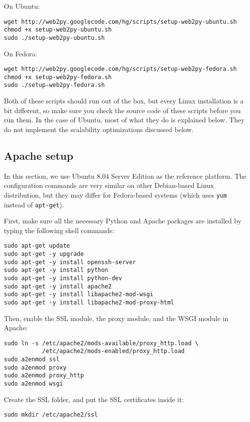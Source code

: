 \documentclass[justified,sixbynine,notoc]{tufte-book}
\def\ft{\small\tt}
\begin{document}
\begin{fullwidth}
On Ubuntu:
\begin{lstlisting}
wget http://web2py.googlecode.com/hg/scripts/setup-web2py-ubuntu.sh
chmod +x setup-web2py-ubuntu.sh
sudo ./setup-web2py-ubuntu.sh
\end{lstlisting}
On Fedora:
\begin{lstlisting}
wget http://web2py.googlecode.com/hg/scripts/setup-web2py-fedora.sh
chmod +x setup-web2py-fedora.sh
sudo ./setup-web2py-fedora.sh
\end{lstlisting}
Both of these scripts should run out of the box, but every Linux installation is a bit different, so make sure you check the source code of these scripts before you run them. In the case of Ubuntu, most of what they do is explained below. They do not implement the scalability optimizations discussed below.

\goodbreak\subsection{Apache setup}

In this section, we use Ubuntu 8.04 Server Edition as the reference platform. The configuration commands are very similar on other Debian-based Linux distribution, but they may differ for Fedora-based systems (which uses {\ft yum} instead of {\ft apt-get}).

First, make sure all the necessary Python and Apache packages are installed by typing the following shell commands:
\begin{lstlisting}
sudo apt-get update
sudo apt-get -y upgrade
sudo apt-get -y install openssh-server
sudo apt-get -y install python
sudo apt-get -y install python-dev
sudo apt-get -y install apache2
sudo apt-get -y install libapache2-mod-wsgi
sudo apt-get -y install libapache2-mod-proxy-html
\end{lstlisting}

Then, enable the SSL module, the proxy module, and the WSGI module in Apache:
\begin{lstlisting}
sudo ln -s /etc/apache2/mods-available/proxy_http.load \
           /etc/apache2/mods-enabled/proxy_http.load
sudo a2enmod ssl
sudo a2enmod proxy
sudo a2enmod proxy_http
sudo a2enmod wsgi
\end{lstlisting}

Create the SSL folder, and put the SSL certificates inside it:
\begin{lstlisting}
sudo mkdir /etc/apache2/ssl
\end{lstlisting}


\end{fullwidth}
\end{document}
